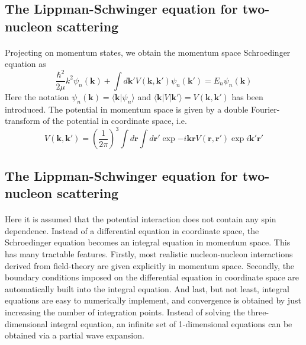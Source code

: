 \documentclass[%
twoside,                 %
final,                   %
10pt]{article}
\begin{document}
\subsection*{The Lippman-Schwinger equation for two-nucleon scattering}

\paragraph{}
Projecting  on momentum states, we obtain the momentum space Schroedinger equation as
\begin{equation}
\frac{\hbar^2}{2\mu}k^2\psi_n(\mathbf{k})+\int d\mathbf{k'}V(\mathbf{k}, \mathbf{k'}) \psi_n(\mathbf{k'})=E_n \psi_n(\mathbf{k})
\label{eq:momspace1}
\end{equation}
Here the notation $\psi_n(\mathbf{k}) =\langle\mathbf{k}\vert\psi_n\rangle $ and 
$\langle\mathbf{k}\vert V\vert\mathbf{k}' \rangle =V(\mathbf{k}, \mathbf{k'})$ has been introduced.
The potential in momentum space is given by a double Fourier-transform 
of the potential in coordinate space, i.e.
\[ 
V(\mathbf{k},\mathbf{k'}) = \left( \frac{1}{2\pi}\right)^3\int d\mathbf{r}\int d\mathbf{r}'\exp{-i\mathbf{kr}}V(\mathbf{r},\mathbf{r}')\exp{i\mathbf{k}'\mathbf{r}'}  
\]



\subsection*{The Lippman-Schwinger equation for two-nucleon scattering}

\paragraph{}
Here it is assumed that the potential interaction does not contain any spin dependence. 
Instead of a differential equation in coordinate space, the Schroedinger
equation becomes an integral equation in momentum space. This has 
many tractable features. Firstly, most realistic 
nucleon-nucleon interactions derived from field-theory are given 
explicitly in momentum space. Secondly, the boundary conditions imposed
on the differential equation in coordinate space are automatically built into the
integral equation. And last, but not least, integral equations are easy to numerically 
implement, and convergence is obtained by just increasing the number of integration
points.
Instead of solving the three-dimensional integral equation, an 
infinite set of 1-dimensional equations can be obtained via a  partial wave
expansion.
\end{document}
